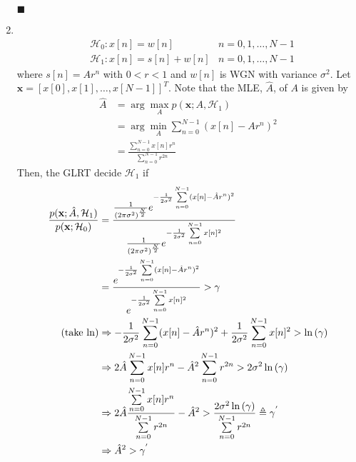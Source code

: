 \documentclass[a4paper,12pt]{article}
\begin{document}
\begin{enumerate}
            \begin{flushright}
                $\blacksquare$
            \end{flushright}
        \item\ 
            \begin{align*}
                &\mathcal H_0 : x[n] = w[n] & n=0,1,\dots,N-1\\
                &\mathcal H_1 : x[n] = s[n]+w[n] & n=0,1,\dots,N-1
            \end{align*}
            where $s[n]=Ar^n$ with $0<r<1$ and $w[n]$ is WGN with variance $\sigma^2$. Let $\mathbf x=[x[0],x[1],\dots,x[N-1]]^T$. Note that the MLE, $\hat{A}$, of $A$ is given by 
            \begin{align*}
                \hat{A} &= \arg\max_{A}p(\mathbf x;A,\mathcal H_1)\\
                &=\arg\min_{A}\sum\limits_{n=0}^{N-1}(x[n]-Ar^n)^2\\
                &=\frac{\sum\limits_{n=0}^{N-1}x[n]r^n}{\sum\limits_{n=0}^{N-1}r^{2n}}
            \end{align*}
            Then, the GLRT decide $\mathcal H_1$ if
            \begin{align*}
                \frac{p(\mathbf x;\hat{A},\mathcal H_1)}{p(\mathbf x;\mathcal H_0)} &= \frac{\frac{1}{(2\pi\sigma^2)^{\frac{N}{2}}}e^{-\frac{1}{2\sigma^2}\sum\limits_{n=0}^{N-1}(x[n]-\hat{A}r^n)^2}}{\frac{1}{(2\pi\sigma^2)^{\frac{N}{2}}}e^{-\frac{1}{2\sigma^2}\sum\limits_{n=0}^{N-1}x[n]^2}}\\
                &= \frac{e^{-\frac{1}{2\sigma^2}\sum\limits_{n=0}^{N-1}(x[n]-\hat{A}r^n)^2}}{e^{-\frac{1}{2\sigma^2}\sum\limits_{n=0}^{N-1}x[n]^2}}>\gamma\\
                ({\rm take\ ln}) &\Rightarrow -\frac{1}{2\sigma^2}\sum\limits_{n=0}^{N-1}(x[n]-\hat{A}r^n)^2+\frac{1}{2\sigma^2}\sum\limits_{n=0}^{N-1}x[n]^2>\ln{(\gamma)}\\
                &\Rightarrow 2\hat{A}\sum\limits_{n=0}^{N-1}x[n]r^n-\hat{A}^2\sum\limits_{n=0}^{N-1}r^{2n}>2\sigma^2\ln{(\gamma)}\\
                &\Rightarrow 2\hat{A}\frac{\sum\limits_{n=0}^{N-1}x[n]r^n}{\sum\limits_{n=0}^{N-1}r^{2n}}-\hat{A}^2>\frac{2\sigma^2\ln{(\gamma)}}{\sum\limits_{n=0}^{N-1}r^{2n}}\triangleq \gamma^{'}\\
                &\Rightarrow \hat{A}^2>\gamma^{'}
            \end{align*}
            \begin{flushright}

\end{flushright}
\end{enumerate}
\end{document}
